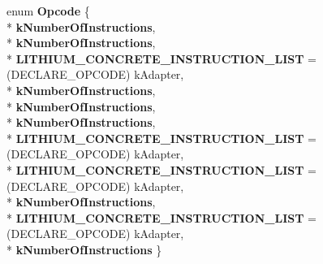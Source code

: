 \begin{DoxyCompactItemize}
\item 
enum {\bfseries Opcode} \{ \\*
{\bfseries k\+Number\+Of\+Instructions}, 
\\*
{\bfseries k\+Number\+Of\+Instructions}, 
\\*
{\bfseries L\+I\+T\+H\+I\+U\+M\+\_\+\+C\+O\+N\+C\+R\+E\+T\+E\+\_\+\+I\+N\+S\+T\+R\+U\+C\+T\+I\+O\+N\+\_\+\+L\+I\+ST} =(D\+E\+C\+L\+A\+R\+E\+\_\+\+O\+P\+C\+O\+DE) k\+Adapter, 
\\*
{\bfseries k\+Number\+Of\+Instructions}, 
\\*
{\bfseries k\+Number\+Of\+Instructions}, 
\\*
{\bfseries k\+Number\+Of\+Instructions}, 
\\*
{\bfseries L\+I\+T\+H\+I\+U\+M\+\_\+\+C\+O\+N\+C\+R\+E\+T\+E\+\_\+\+I\+N\+S\+T\+R\+U\+C\+T\+I\+O\+N\+\_\+\+L\+I\+ST} =(D\+E\+C\+L\+A\+R\+E\+\_\+\+O\+P\+C\+O\+DE) k\+Adapter, 
\\*
{\bfseries L\+I\+T\+H\+I\+U\+M\+\_\+\+C\+O\+N\+C\+R\+E\+T\+E\+\_\+\+I\+N\+S\+T\+R\+U\+C\+T\+I\+O\+N\+\_\+\+L\+I\+ST} =(D\+E\+C\+L\+A\+R\+E\+\_\+\+O\+P\+C\+O\+DE) k\+Adapter, 
\\*
{\bfseries k\+Number\+Of\+Instructions}, 
\\*
{\bfseries L\+I\+T\+H\+I\+U\+M\+\_\+\+C\+O\+N\+C\+R\+E\+T\+E\+\_\+\+I\+N\+S\+T\+R\+U\+C\+T\+I\+O\+N\+\_\+\+L\+I\+ST} =(D\+E\+C\+L\+A\+R\+E\+\_\+\+O\+P\+C\+O\+DE) k\+Adapter, 
\\*
{\bfseries k\+Number\+Of\+Instructions}
 \}\hypertarget{classv8_1_1internal_1_1_l_instruction_a5fface668216c981c65cddd0c9feb0de}{}\label{classv8_1_1internal_1_1_l_instruction_a5fface668216c981c65cddd0c9feb0de}

\end{DoxyCompactItemize}
